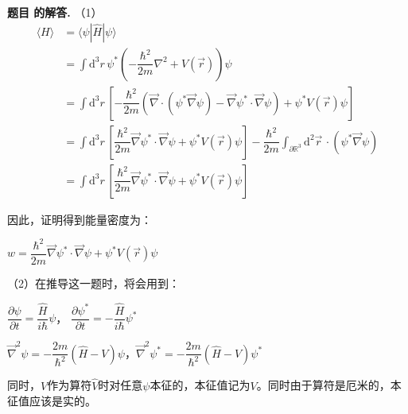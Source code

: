 \documentclass[12pt, a4paper, oneside]{ctexart}
\newcounter{problemname}
\newenvironment{solution}
  {\par\noindent\textbf{题目 \theproblemname 的解答. }}
  {\par}
\begin{document}
\begin{solution}
    （1）
    \begin{align*}
        \langle H \rangle &= \langle \psi | \hat{H} |\psi\rangle\\
        &= \displaystyle \int \mathrm{d}^3r \, \psi^* \left( -\dfrac{\hbar^2}{2m}\nabla^2 + V(\vec{r})\right) \psi \\
        &= \displaystyle \int \mathrm{d}^3r \, \left[-\dfrac{\hbar^2}{2m}\left( \vec{\nabla} \cdot (\psi^* \vec{\nabla} \psi) - \vec{\nabla} \psi^* \cdot \vec{\nabla}\psi\right) + \psi^* V(\vec{r}) \psi \right]\\
        &= \displaystyle \int \mathrm{d}^3r \, \left[\dfrac{\hbar^2}{2m} \vec{\nabla} \psi^* \cdot \vec{\nabla}\psi + \psi^* V(\vec{r}) \psi\right] - \dfrac{\hbar^2}{2m} \displaystyle \int_{\partial \mathbb{R}^3} \mathrm{d}^2\vec{r} \,   \cdot (\psi^* \vec{\nabla} \psi)\\
        &= \displaystyle \int \mathrm{d}^3r \, \left[\dfrac{\hbar^2}{2m} \vec{\nabla} \psi^* \cdot \vec{\nabla}\psi + \psi^* V(\vec{r}) \psi\right]
    \end{align*}

    因此，证明得到能量密度为：

    \centerline{$w = \dfrac{\hbar^2}{2m} \vec{\nabla} \psi^* \cdot \vec{\nabla} \psi + \psi^* V(\vec{r})  \psi$}

    （2）在推导这一题时，将会用到：

    \centerline{$\dfrac{\partial \psi}{\partial t} = \dfrac{\hat{H}}{i\hbar} \psi$， $\dfrac{\partial \psi^*}{\partial t} = -\dfrac{\hat{H}}{i\hbar} \psi^*$}

    \centerline{$\vec{\nabla}^2 \psi = -\dfrac{2m}{\hbar^2}(\hat{H}- V) \psi$，$\vec{\nabla}^2 \psi^* = -\dfrac{2m}{\hbar^2}(\hat{H}- V) \psi^*$}

    同时，$V$作为算符$\hat{V}$时对任意$\psi$本征的，本征值记为$V$。同时由于算符是厄米的，本征值应该是实的。


\end{solution}
\end{document}
